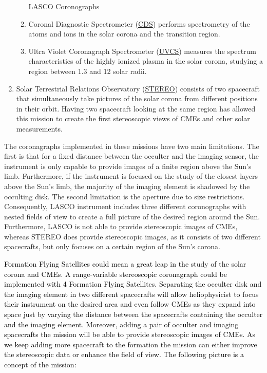 \begin{enumerate}
\begin{enumerate}
\begin{table}[H]
\caption{LASCO Coronographs \cite{LASCO_Coronal_Imaging_Spectroscopy}}


\end{table}


\item Coronal Diagnostic Spectrometer (\href{http://solar.bnsc.rl.ac.uk/}{CDS})
performs spectrometry of the atoms and ions in the solar corona and
the transition region.
\item Ultra Violet Coronagraph Spectrometer (\href{http://www.cfa.harvard.edu/uvcs/}{UVCS})
measures the spectrum characteristics of the highly ionized plasma
in the solar corona, studying a region between 1.3 and 12 solar radii.
\end{enumerate}
\item Solar Terrestrial Relations Observatory (\href{http://www.nasa.gov/mission_pages/stereo/main/index.html\#.UjUnXsYagWA}{STEREO})
consists of two spacecraft that simultaneously take pictures of the
solar corona from different positions in their orbit. Having two spacecraft
looking at the same region has allowed this mission to create the
first stereoscopic views of CMEs and other solar measurements. 
\end{enumerate}
The coronagraphs implemented in these missions have two main limitations.
The first is that for a fixed distance between the occulter and the
imaging sensor, the instrument is only capable to provide images of
a finite region above the Sun's limb. Furthermore, if the instrument
is focused on the study of the closest layers above the Sun's limb,
the majority of the imaging element is shadowed by the occulting disk.
The second limitation is the aperture due to size restrictions. Consequently,
LASCO instrument includes three different coronographs with nested
fields of view to create a full picture of the desired region around
the Sun. Furthermore, LASCO is not able to provide stereoscopic images
of CMEs, whereas STEREO does provide stereoscopic images, as it consists
of two different spacecrafts, but only focuses on a certain region
of the Sun's corona.

\textcolor{black}{Formation Flying Satellites could mean a great leap
in the study of the solar corona and CMEs. A range-variable stereoscopic
coronagraph could be implemented with 4 Formation Flying Satellites.
Separating the occulter disk and the imaging element in two different
spacecrafts will allow heliophysicist to focus their instrument on
the desired area and even follow CMEs as they expand into space just
by varying the distance between the spacecrafts containing the occulter
and the imaging element. Moreover, adding a pair of occulter and imaging
spacecrafts the mission will be able to provide stereoscopic images
of CMEs. As we keep adding more spacecraft to the formation the mission
can either improve the stereoscopic data or enhance the field of view.
The following picture is a concept of the mission:}


